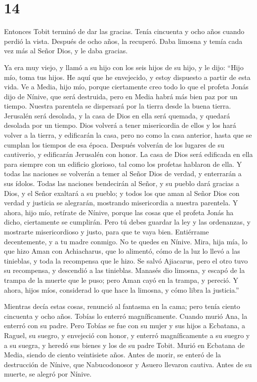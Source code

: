 \hypertarget{section-13}{%
\section{14}\label{section-13}}

 Entonces Tobit terminó de dar las gracias. 
Tenía cincuenta y ocho años cuando perdió la vista. Después de ocho
años, la recuperó. Daba limosna y temía cada vez más al Señor Dios, y le
daba gracias.

 Ya era muy viejo, y llamó a su hijo con los seis hijos de
su hijo, y le dijo: ``Hijo mío, toma tus hijos. He aquí que he
envejecido, y estoy dispuesto a partir de esta vida.  Ve a
Media, hijo mío, porque ciertamente creo todo lo que el profeta Jonás
dijo de Nínive, que será destruida, pero en Media habrá más bien paz por
un tiempo. Nuestra parentela se dispersará por la tierra desde la buena
tierra. Jerusalén será desolada, y la casa de Dios en ella será quemada,
y quedará desolada por un tiempo.  Dios volverá a tener
misericordia de ellos y los hará volver a la tierra, y edificarán la
casa, pero no como la casa anterior, hasta que se cumplan los tiempos de
esa época. Después volverán de los lugares de su cautiverio, y
edificarán Jerusalén con honor. La casa de Dios será edificada en ella
para siempre con un edificio glorioso, tal como los profetas hablaron de
ella.  Y todas las naciones se volverán a temer al Señor
Dios de verdad, y enterrarán a sus ídolos.  Todas las
naciones bendecirán al Señor, y su pueblo dará gracias a Dios, y el
Señor exaltará a su pueblo; y todos los que aman al Señor Dios con
verdad y justicia se alegrarán, mostrando misericordia a nuestra
parentela.  Y ahora, hijo mío, retírate de Nínive, porque
las cosas que el profeta Jonás ha dicho, ciertamente se cumplirán.
 Pero tú debes guardar la ley y las ordenanzas, y
mostrarte misericordioso y justo, para que te vaya bien. 
Entiérrame decentemente, y a tu madre conmigo. No te quedes en Nínive.
Mira, hija mía, lo que hizo Aman con Achiacharus, que lo alimentó, cómo
de la luz lo llevó a las tinieblas, y toda la recompensa que le hizo. Se
salvó Ajiacarus, pero el otro tuvo su recompensa, y descendió a las
tinieblas. Manasés dio limosna, y escapó de la trampa de la muerte que
le puso; pero Aman cayó en la trampa, y pereció.  Y
ahora, hijos míos, considerad lo que hace la limosna, y cómo libra la
justicia.''

Mientras decía estas cosas, renunció al fantasma en la cama; pero tenía
ciento cincuenta y ocho años. Tobías lo enterró magníficamente.
 Cuando murió Ana, la enterró con su padre. Pero Tobías
se fue con su mujer y sus hijos a Ecbatana, a Raguel, su suegro,
 y envejeció con honor, y enterró magníficamente a su
suegro y a su suegra, y heredó sus bienes y los de su padre Tobit.
 Murió en Ecbatana de Media, siendo de ciento veintisiete
años.  Antes de morir, se enteró de la destrucción de
Nínive, que Nabucodonosor y Asuero llevaron cautiva. Antes de su muerte,
se alegró por Nínive.
